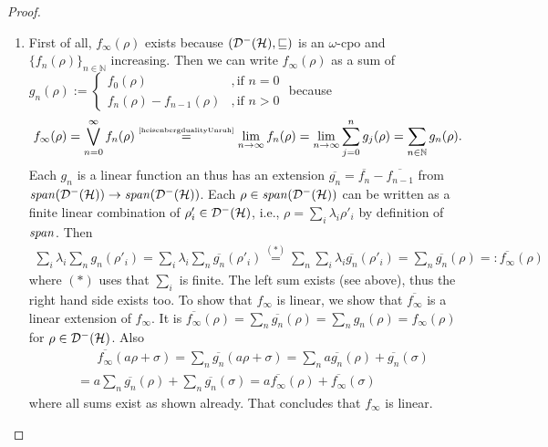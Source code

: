 \documentclass[a4paper,UKenglish,cleveref, autoref, thm-restate]{lipics-v2021}
\begin{document}
\begin{proof}
    \begin{enumerate}
        \item First of all, $f_\infty (\rho)$ exists because $(\mathcal{D}^- (\mathcal{H}), \sqsubseteq)$ is an $\omega$-cpo and $\{f_n(\rho)\}_{n\in \mathbb{N}}$ increasing.
        Then we can write $f_\infty (\rho)$ as a sum of $g_n(\rho) := \begin{cases} f_0(\rho) &,\text{if } n=0\\
            f_n(\rho)-f_{n-1}(\rho) &, \text{if }n>0\end{cases}$ because
        \begin{equation*}
            f_\infty(\rho) = \bigvee_{n=0}^\infty f_n(\rho) \overset{\text{\tiny\cite[Lem. 30]{heisenbergdualityUnruh}}}{=}\lim_{n \to \infty} f_n(\rho) = \lim_{n\to \infty} \sum_{j=0}^n g_j(\rho) = \sum_{n \in \mathbb{N}}g_n(\rho).
        \end{equation*}
        Each $g_n$ is a linear function an thus has an extension $\overline{g_n}= \overline{f_n} - \overline{f_{n-1}}$ from $\mathit{span}(\mathcal{D}^- (\mathcal{H})) \to \mathit{span}(\mathcal{D}^- (\mathcal{H}))$. Each $\rho\in \mathit{span}(\mathcal{D}^- (\mathcal{H}))$ can be written as a finite linear combination of $\rho'_i \in \mathcal{D}^- (\mathcal{H})$, i.e., $\rho = \sum_i \lambda_i \rho'_i$ by definition of $\mathit{span}$. Then
        \begin{align*}
            \sum_i \lambda_i \sum_n g_n(\rho'_i)=  \sum_i \lambda_i \sum_n \overline{g_n}(\rho'_i) \overset{(*)}{=} \sum_n \sum_i \lambda_i \overline{g_n}(\rho'_i)= \sum_n \overline{g_n}(\rho) =: \overline{f_\infty}(\rho)
        \end{align*}
        where $(*)$ uses that $\sum_i$ is finite.
        The left sum exists (see above), thus the right hand side exists too.
        To show that $f_\infty$ is linear, we show that $\overline{f_\infty}$ is a linear extension of $f_\infty$. It is $\overline{f_\infty}(\rho)=\sum_n \overline{g_n}(\rho) = \sum_n g_n(\rho) = f_\infty(\rho)$ for $\rho \in \mathcal{D}^- (\mathcal{H})$. Also \begin{align*}
            &\phantom{=.}\overline{f_\infty}(a \rho + \sigma)
            = \sum_n \overline{g_n}(a \rho + \sigma)
            = \sum_n a \overline{g_n}(\rho) + \overline{g_n}(\sigma)\\
            &= a \sum_n \overline{g_n}(\rho) + \sum_n \overline{g_n}(\sigma)
            = a \overline{f_\infty}(\rho) + \overline{f_\infty}(\sigma)
        \end{align*}
        where all sums exist as shown already. That concludes that $f_\infty$ is linear.


\end{enumerate}
\end{proof}
\end{document}
